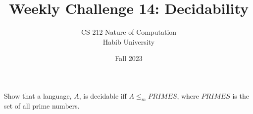 \documentclass[a4paper]{exam}
\title{Weekly Challenge 14: Decidability}
\author{CS 212 Nature of Computation\\Habib University}
\date{Fall 2023}
\theoremstyle{theorem}
\theoremstyle{claim}
\begin{document}
\maketitle

\begin{questions}


  Show that a language, $A$, is decidable iff $A \le_m PRIMES$, where $PRIMES$ is the set of all prime numbers.

\end{questions}
\end{document}
